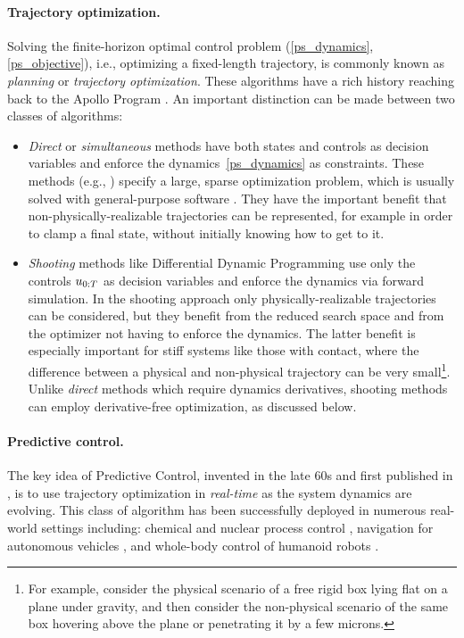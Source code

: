 \paragraph{Trajectory optimization.}
Solving the finite-horizon optimal control problem (\ref{ps_dynamics}, \ref{ps_objective}), i.e., optimizing a fixed-length trajectory, is commonly known as \emph{planning} or \emph{trajectory optimization}. These algorithms \cite{von1992direct, betts1998survey} have a rich history reaching back to the Apollo Program \cite{manned1971apollo,smith1967trajectory}. An important distinction can be made between two classes of algorithms:
\begin{itemize}
	\item \emph{Direct} or \emph{simultaneous} methods have both states and controls as decision variables and enforce the dynamics~\eqref{ps_dynamics} as constraints. These methods (e.g., \cite{stryk1993numerical}) specify a large, sparse optimization problem, which is usually solved with general-purpose software \cite{wachter2006implementation, gill2005snopt}. They have the important benefit that non-physically-realizable trajectories can be represented, for example in order to clamp a final state, without initially knowing how to get to it.
	\item \emph{Shooting} methods like Differential Dynamic Programming \cite{jacobson1970differential} use only the controls ${u}_{0:T}$ as decision variables and enforce the dynamics via forward simulation. In the shooting approach only physically-realizable trajectories can be considered, but they benefit from the reduced search space and from the optimizer not having to enforce the dynamics. The latter benefit is especially important for stiff systems like those with contact, where the difference between a physical and non-physical trajectory can be very small\footnote{For example, consider the physical scenario of a free rigid box lying flat on a plane under gravity, and then consider the non-physical scenario of the same box hovering above the plane or penetrating it by a few microns.}. Unlike \emph{direct} methods which require dynamics derivatives, shooting methods can employ derivative-free optimization, as discussed below.
\end{itemize}

\paragraph{Predictive control.}

The key idea of Predictive Control, invented in the late 60s and first published in \cite{richalet1978model}, is to use trajectory optimization in \emph{real-time} as the system dynamics are evolving. This class of algorithm has been successfully deployed in numerous real-world settings including: chemical and nuclear process control \cite{na2003model, lopez2013fast}, navigation for autonomous vehicles \cite{falcone2007predictive}, and whole-body control of humanoid robots \cite{kuindersma2016optimization}.

